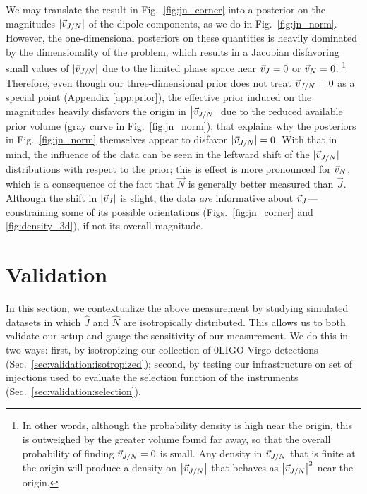 \documentclass[aps,prd,twocolumn,superscriptaddress,preprintnumbers,floatfix,nofootinbib]{revtex4-2}
\newcommand{\Nevents}{0}
\begin{document}
We may translate the result in Fig.~\ref{fig:jn_corner} into a posterior on the magnitudes $|\vec{v}_{J/N}|$ of the dipole components, as we do in Fig.~\ref{fig:jn_norm}.
However, the one-dimensional posteriors on these quantities is heavily dominated by the dimensionality of the problem, which results in a Jacobian disfavoring small values of $|\vec{v}_{J/N}|$ due to the limited phase space near $\vec{v}_{J}=0$ or $\vec{v}_{N} = 0$.%
\footnote{In other words, although the probability density is high near the origin, this is outweighed by the greater volume found far away, so that the overall probability of finding $\vec{v}_{J/N}=0$ is small.  Any density in $\vec{v}_{J/N}$ that is finite at the origin will produce a density on $\left| \vec{v}_{J/N} \right|$ that behaves as $\left| \vec{v}_{J/N} \right|^2$ near the origin.}
Therefore, even though our three-dimensional prior does not treat $\vec{v}_{J/N} = 0$ as a special point (Appendix \ref{app:prior}), the effective prior induced on the magnitudes heavily disfavors the origin in $\left| \vec{v}_{J/N} \right|$ due to the reduced available prior volume (gray curve in Fig.~\ref{fig:jn_norm}); that explains why the posteriors in Fig.~\ref{fig:jn_norm} themselves appear to disfavor $|\vec{v}_{J/N}| = 0$.
With that in mind, the influence of the data can be seen in the leftward shift of the $|\vec{v}_{J/N}|$ distributions with respect to the prior; this is effect is more pronounced for $\vec{v}_{N}$, which is a consequence of the fact that $\vec{N}$ is generally better measured than $\vec{J}$.
Although the shift in $|\vec{v}_{J}|$ is slight, the data \emph{are} informative about $\vec{v}_{J}$---constraining some of its possible orientations (Figs.~\ref{fig:jn_corner} and \ref{fig:density_3d}), if not its overall magnitude.

\section{Validation}
\label{sec:validation}

In this section, we contextualize the above measurement by studying simulated datasets in which $\hat{J}$ and $\hat{N}$ are isotropically distributed.
This allows us to both validate our setup and gauge the sensitivity of our measurement.
We do this in two ways: first, by isotropizing our collection of \Nevents LIGO-Virgo detections (Sec.~\ref{sec:validation:isotropized}); second, by testing our infrastructure on set of injections used to evaluate the selection function of the instruments (Sec.~\ref{sec:validation:selection}).
\end{document}
